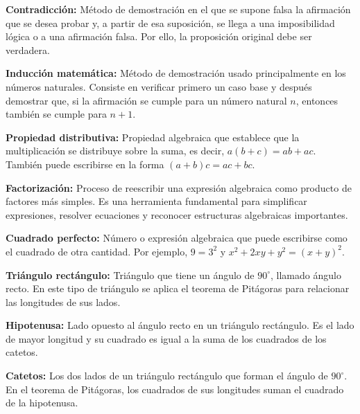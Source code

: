\documentclass[12pt,final]{report}
\theoremstyle{plain}
\theoremstyle{definition}
\begin{document}
\vspace{0.5em}

\textbf{Contradicción:} Método de demostración en el que se supone falsa la afirmación que se desea probar y, a partir de esa suposición, se llega a una imposibilidad lógica o a una afirmación falsa. Por ello, la proposición original debe ser verdadera.

\vspace{0.5em}

\textbf{Inducción matemática:} Método de demostración usado principalmente en los números naturales. Consiste en verificar primero un caso base y después demostrar que, si la afirmación se cumple para un número natural $n$, entonces también se cumple para $n+1$.

\vspace{0.5em}

\textbf{Propiedad distributiva:} Propiedad algebraica que establece que la multiplicación se distribuye sobre la suma, es decir, $a(b+c) = ab + ac$. También puede escribirse en la forma $(a+b)c = ac + bc$.

\vspace{0.5em}

\textbf{Factorización:} Proceso de reescribir una expresión algebraica como producto de factores más simples. Es una herramienta fundamental para simplificar expresiones, resolver ecuaciones y reconocer estructuras algebraicas importantes.

\vspace{0.5em}

\textbf{Cuadrado perfecto:} Número o expresión algebraica que puede escribirse como el cuadrado de otra cantidad. Por ejemplo, $9 = 3^2$ y $x^2 + 2xy + y^2 = (x+y)^2$.

\vspace{0.5em}

\textbf{Triángulo rectángulo:} Triángulo que tiene un ángulo de $90^\circ$, llamado ángulo recto. En este tipo de triángulo se aplica el teorema de Pitágoras para relacionar las longitudes de sus lados.

\vspace{0.5em}

\textbf{Hipotenusa:} Lado opuesto al ángulo recto en un triángulo rectángulo. Es el lado de mayor longitud y su cuadrado es igual a la suma de los cuadrados de los catetos.

\vspace{0.5em}

\textbf{Catetos:} Los dos lados de un triángulo rectángulo que forman el ángulo de $90^\circ$. En el teorema de Pitágoras, los cuadrados de sus longitudes suman el cuadrado de la hipotenusa.
\end{document}
